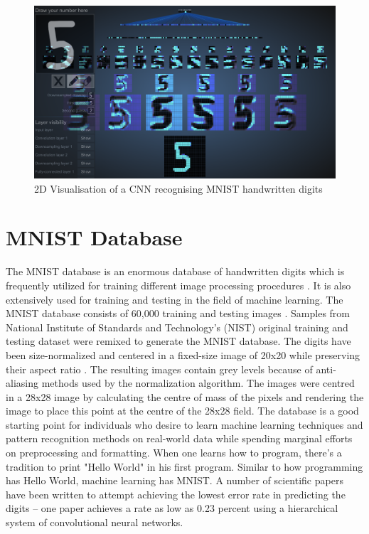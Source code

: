 \begin{figure}[h!]
\centering
\includegraphics[width=13cm]{figures/ConvNet_2D.png}
\caption{2D Visualisation of a CNN recognising MNIST handwritten digits \cite{harley2015isvc}}
\label{fig:cnn6}
\end{figure}

\section{MNIST Database}
\label{sect5_2}
The \ac{MNIST} database is an enormous database of handwritten digits which is frequently utilized for training different image processing procedures \cite{mnist_wiki}. It is also extensively used for training and testing in the field of machine learning. \newline\newline 
The MNIST database consists of 60,000 training and testing images \cite{mnist_kus_ernst}. Samples from National Institute of Standards and Technology’s (NIST) original training and testing dataset were remixed to generate the MNIST database. The digits have been size-normalized and centered in a fixed-size image of 20x20 while preserving their aspect ratio \cite{cnn_lecun_mnist_app}. The resulting images contain grey levels because of anti-aliasing methods used by the normalization algorithm. The images were centred in a 28x28 image by calculating the centre of mass of the pixels and rendering the image to place this point at the centre of the 28x28 field. \newline\newline
The database is a good starting point for individuals who desire to learn machine learning techniques and pattern recognition methods on real-world data while spending marginal efforts on preprocessing and formatting. When one learns how to program, there's a tradition to print "Hello World" in his first program. Similar to how programming has Hello World, machine learning has MNIST. \newline\newline
A number of scientific papers have been written to attempt achieving the lowest error rate in predicting the digits – one paper achieves a rate as low as 0.23 percent using a hierarchical system of convolutional neural networks.

